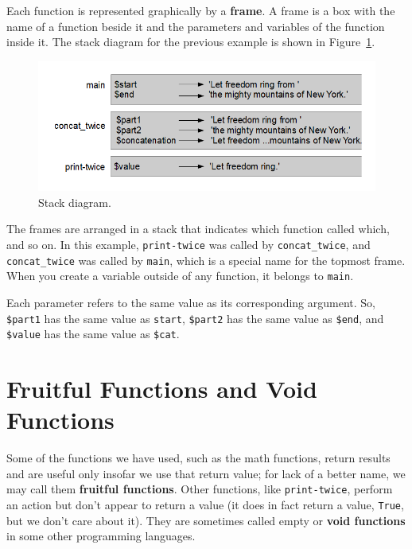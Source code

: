 Each function is represented graphically by a {\bf frame}.  A frame 
is a box with the name of a function beside it and the parameters 
and variables of the function inside it.  The stack diagram for 
the previous example is shown in Figure~\ref{fig.stack}.

\begin{figure}
\centerline
{\includegraphics[scale=0.8]{figs/stack_diagram.png}}
\caption{Stack diagram.}
\label{fig.stack}
\end{figure}


The frames are arranged in a stack that indicates which function
called which, and so on.  In this example, \verb"print-twice"
was called by \verb"concat_twice", and \verb"concat_twice" was called by 
\verb"main", which is a special name for the topmost frame.  When
you create a variable outside of any function, it belongs to 
\verb"main".

Each parameter refers to the same value as its corresponding
argument.  So, {\tt \$part1} has the same value as
{\tt start}, {\tt \$part2} has the same value as {\tt \$end},
and {\tt \$value} has the same value as {\tt \$cat}.


\section{Fruitful Functions and Void Functions}

Some of the functions we have used, such as the 
math functions, return results and are useful only insofar 
we use that return value; for lack of a better name, we 
may call them {\bf fruitful functions}.  Other functions, 
like \verb"print-twice", perform an action but don't appear 
to return a value (it does in fact return a value, {\tt True}, 
but we don't care about it).  They are sometimes called empty or 
{\bf void functions} in some other programming languages.

